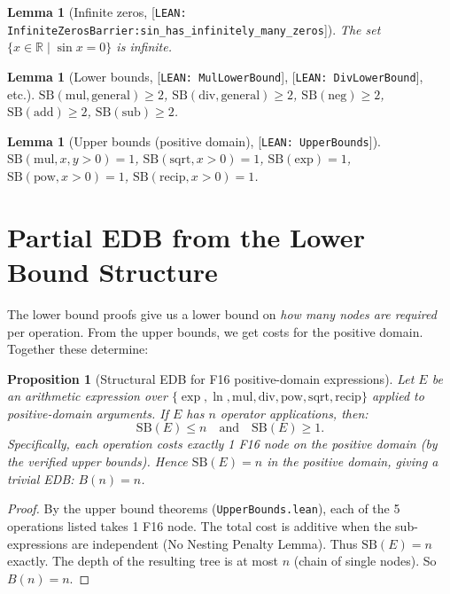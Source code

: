 \documentclass[11pt]{article}
\newtheorem{lemma}[theorem]{Lemma}
\newtheorem{proposition}[theorem]{Proposition}
\newcommand{\lv}[1]{\textcolor{lean}{[\texttt{LEAN: #1}]}}
\begin{document}
\begin{lemma}[Infinite zeros, \lv{InfiniteZerosBarrier:sin\_has\_infinitely\_many\_zeros}]
The set $\{x \in \mathbb{R} \mid \sin x = 0\}$ is infinite.
\end{lemma}

\begin{lemma}[Lower bounds, \lv{MulLowerBound}, \lv{DivLowerBound}, etc.]
$\mathrm{SB}(\mathrm{mul}, \mathrm{general}) \geq 2$,
$\mathrm{SB}(\mathrm{div}, \mathrm{general}) \geq 2$,
$\mathrm{SB}(\mathrm{neg}) \geq 2$,
$\mathrm{SB}(\mathrm{add}) \geq 2$,
$\mathrm{SB}(\mathrm{sub}) \geq 2$.
\end{lemma}

\begin{lemma}[Upper bounds (positive domain), \lv{UpperBounds}]
$\mathrm{SB}(\mathrm{mul}, x,y>0) = 1$,
$\mathrm{SB}(\mathrm{sqrt}, x>0) = 1$,
$\mathrm{SB}(\mathrm{exp}) = 1$,
$\mathrm{SB}(\mathrm{pow}, x>0) = 1$,
$\mathrm{SB}(\mathrm{recip}, x>0) = 1$.
\end{lemma}

\section{Partial EDB from the Lower Bound Structure}

The lower bound proofs give us a lower bound on \emph{how many nodes are required}
per operation. From the upper bounds, we get costs for the positive domain.
Together these determine:

\begin{proposition}[Structural EDB for F16 positive-domain expressions]
Let $E$ be an arithmetic expression over $\{\exp, \ln, \mathrm{mul}, \mathrm{div},
\mathrm{pow}, \mathrm{sqrt}, \mathrm{recip}\}$ applied to positive-domain arguments.
If $E$ has $n$ operator applications, then:
\[
\mathrm{SB}(E) \leq n \quad \text{and} \quad \mathrm{SB}(E) \geq 1.
\]
Specifically, each operation costs exactly 1 F16 node on the positive domain
(by the verified upper bounds). Hence $\mathrm{SB}(E) = n$ in the positive domain,
giving a trivial EDB: $B(n) = n$.
\end{proposition}

\begin{proof}
By the upper bound theorems (\texttt{UpperBounds.lean}), each of the 5 operations
listed takes 1 F16 node. The total cost is additive when the sub-expressions are
independent (No Nesting Penalty Lemma). Thus $\mathrm{SB}(E) = n$ exactly.
The depth of the resulting tree is at most $n$ (chain of single nodes). So $B(n) = n$.
\end{proof}
\end{document}
